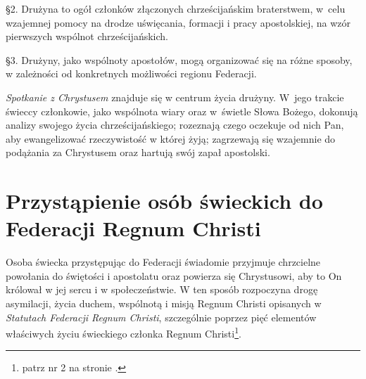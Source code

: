 \S{}2. Drużyna to ogół członków złączonych chrześcijańskim braterstwem, \mbox{w celu} wzajemnej pomocy na drodze uświęcania, formacji i pracy apostolskiej, na wzór pierwszych wspólnot chrześcijańskich.

\S{}3. Drużyny, jako wspólnoty apostołów, mogą organizować się na różne sposoby, w zależności od konkretnych możliwości regionu Federacji.


 {\em Spotkanie z Chrystusem} znajduje się w centrum życia drużyny. \mbox{W jego} trakcie świeccy członkowie, jako wspólnota wiary oraz \mbox{w świetle} Słowa Bożego, dokonują analizy swojego życia chrześcijańskiego; rozeznają czego oczekuje od nich Pan, aby ewangelizować rzeczywistość w której żyją; zagrzewają się wzajemnie do podążania za Chrystusem oraz hartują swój zapał apostolski.

\chapter{Przystąpienie osób świeckich do Federacji Regnum Christi}


 Osoba świecka przystępując do Federacji świadomie przyjmuje chrzcielne powołania do świętości i apostolatu oraz powierza się Chrystusowi, aby to On królował w jej sercu i w społeczeństwie. W ten sposób rozpoczyna drogę asymilacji, życia duchem, wspólnotą i misją Regnum Christi opisanych w {\em Statutach Federacji Regnum Christi}, szczególnie poprzez pięć elementów właściwych życiu świeckiego członka Regnum Christi\footnote{patrz nr 2 na stronie \pageref{numerdwa}.}.

\filbreak{}

